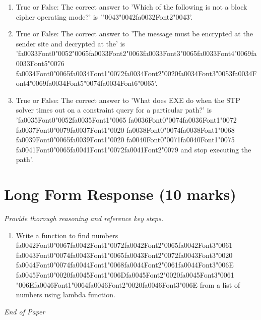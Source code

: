 \documentclass[12pt]{article}
\begin{document}
\begin{enumerate}[label=\arabic*.]
\item True or False: The correct answer to 'Which of the following is not a block cipher operating mode?' is '{\char"0043}{\char"0042}{\csname fa0032Font2\endcsname\char"0043}'.
\item True or False: The correct answer to 'The message must be encrypted at the sender site and decrypted at the' is '{\csname fa0033Font0\endcsname\char"0052}{\char"0065}{\csname fa0033Font2\endcsname\char"0063}{\csname fa0033Font3\endcsname\char"0065}{\csname fa0033Font4\endcsname\char"0069}{\csname fa0033Font5\endcsname\char"0076} {\csname fa0034Font0\endcsname\char"0065}{\csname fa0034Font1\endcsname\char"0072}{\csname fa0034Font2\endcsname\char"0020}{\csname fa0034Font3\endcsname\char"0053}{\csname fa0034Font4\endcsname\char"0069}{\csname fa0034Font5\endcsname\char"0074}{\csname fa0034Font6\endcsname\char"0065}'.
\item True or False: The correct answer to 'What does EXE do when the STP solver times out on a constraint query for a particular path?' is '{\csname fa0035Font0\endcsname\char"0052}{\csname fa0035Font1\endcsname\char"0065} {\csname fa0036Font0\endcsname\char"0074}{\csname fa0036Font1\endcsname\char"0072} {\csname fa0037Font0\endcsname\char"0079}{\csname fa0037Font1\endcsname\char"0020} {\csname fa0038Font0\endcsname\char"0074}{\csname fa0038Font1\endcsname\char"0068} {\csname fa0039Font0\endcsname\char"0065}{\csname fa0039Font1\endcsname\char"0020} {\csname fa0040Font0\endcsname\char"0071}{\csname fa0040Font1\endcsname\char"0075} {\csname fa0041Font0\endcsname\char"0065}{\csname fa0041Font1\endcsname\char"0072}{\csname fa0041Font2\endcsname\char"0079} and stop executing the path'.
\end{enumerate}

\section*{Long Form Response (10 marks)}
\textit{Provide thorough reasoning and reference key steps.}
\begin{enumerate}[label=\arabic*.]
\item Write a function to find numbers {\csname fa0042Font0\endcsname\char"0067}{\csname fa0042Font1\endcsname\char"0072}{\csname fa0042Font2\endcsname\char"0065}{\csname fa0042Font3\endcsname\char"0061} {\csname fa0043Font0\endcsname\char"0074}{\csname fa0043Font1\endcsname\char"0065}{\csname fa0043Font2\endcsname\char"0072}{\csname fa0043Font3\endcsname\char"0020} {\csname fa0044Font0\endcsname\char"0074}{\csname fa0044Font1\endcsname\char"0068}{\csname fa0044Font2\endcsname\char"0061}{\csname fa0044Font3\endcsname\char"006E} {\csname fa0045Font0\endcsname\char"0020}{\csname fa0045Font1\endcsname\char"006D}{\csname fa0045Font2\endcsname\char"0020}{\csname fa0045Font3\endcsname\char"0061} {\char"006E}{\csname fa0046Font1\endcsname\char"0064}{\csname fa0046Font2\endcsname\char"0020}{\csname fa0046Font3\endcsname\char"006E} from a list of numbers using lambda
function.
\end{enumerate}

\vfill
\noindent\textit{End of Paper}
\end{document}
